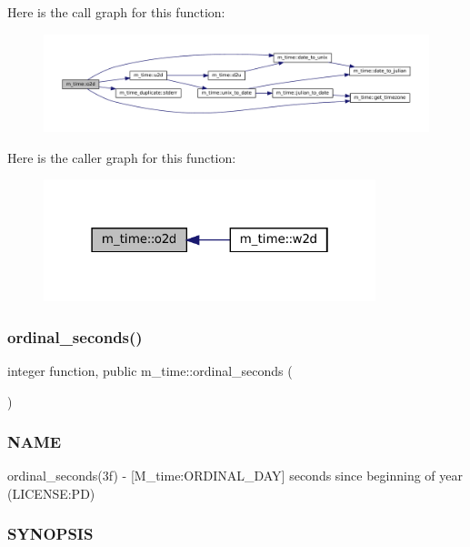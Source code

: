 Here is the call graph for this function\+:\nopagebreak
\begin{figure}[H]
\begin{center}
\leavevmode
\includegraphics[width=350pt]{namespacem__time_a55e2cb9efc9d4d209ae2864f073d4f19_cgraph}
\end{center}
\end{figure}
Here is the caller graph for this function\+:\nopagebreak
\begin{figure}[H]
\begin{center}
\leavevmode
\includegraphics[width=274pt]{namespacem__time_a55e2cb9efc9d4d209ae2864f073d4f19_icgraph}
\end{center}
\end{figure}
\mbox{\label{namespacem__time_ab8960d2aa60e134bcf77247d8b257963}} 
\subsubsection{\texorpdfstring{ordinal\+\_\+seconds()}{ordinal\_seconds()}}
{\footnotesize\ttfamily integer function, public m\+\_\+time\+::ordinal\+\_\+seconds (\begin{DoxyParamCaption}{ }\end{DoxyParamCaption})}



\subsubsection*{N\+A\+ME}

ordinal\+\_\+seconds(3f) -\/ \mbox{[}M\+\_\+time\+:O\+R\+D\+I\+N\+A\+L\+\_\+\+D\+AY\mbox{]} seconds since beginning of year (L\+I\+C\+E\+N\+SE\+:PD) \subsubsection*{S\+Y\+N\+O\+P\+S\+IS}

